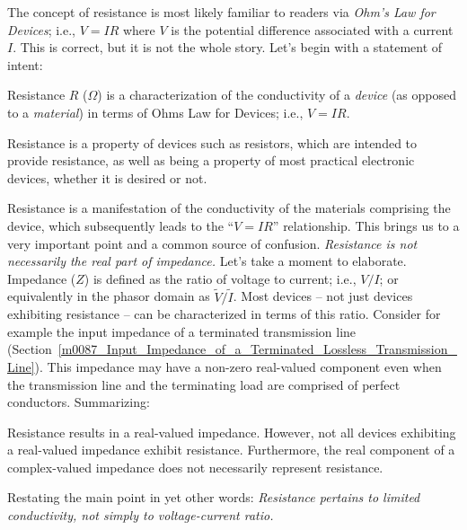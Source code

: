 

\label{m0071_Resistance_DC} %

The concept of resistance is most likely familiar to readers via \emph{Ohm's Law for Devices}; i.e., $V=IR$ where $V$ is the potential difference associated with a current $I$.
This is correct, but it is not the whole story. 
Let's begin with a statement of intent:
%
\begin{mdframed}[backgroundcolor=yellow!20,nobreak=true] 
Resistance 
$R$ ($\Omega$) is a characterization of the conductivity of a \emph{device} (as opposed to a \emph{material}) in terms of Ohms Law for Devices; i.e., $V=IR$.
\end{mdframed}
%
Resistance is a property of devices such as resistors, which are intended to provide resistance, as well as being a property of most practical electronic devices, whether it is desired or not.  

Resistance is a manifestation of the conductivity of the materials comprising the device, which subsequently leads to the ``$V=IR$'' relationship.  This brings us to a very important point and a common source of confusion.
\emph{Resistance is not necessarily the real part of impedance.}
Let's take a moment to elaborate.
Impedance ($Z$) is defined as the ratio of voltage to current; i.e., $V/I$; or equivalently in the phasor domain as $\widetilde{V}/\widetilde{I}$.
Most devices -- not just devices exhibiting resistance -- can be characterized in terms of this ratio.
Consider for example the input impedance of a terminated transmission line (Section~\ref{m0087_Input_Impedance_of_a_Terminated_Lossless_Transmission_Line}).  This impedance may have a non-zero real-valued component even when the transmission line and the terminating load are comprised of perfect conductors.
Summarizing:
\begin{mdframed}[backgroundcolor=yellow!20,nobreak=true] 
Resistance results in a real-valued impedance. However, not all devices exhibiting a real-valued impedance exhibit resistance.  Furthermore, the real component of a complex-valued impedance does not necessarily represent resistance. 
\end{mdframed}
%
Restating the main point in yet other words: \emph{Resistance pertains to limited conductivity, not simply to voltage-current ratio.}

